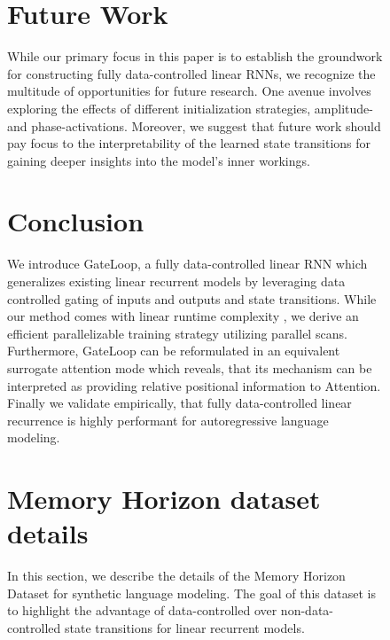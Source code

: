 \documentclass{article} \usepackage{iclr2024_conference,times}
\begin{document}
\begin{figure}[H]
\begin{minipage}{0.6\textwidth}
\section{Future Work}

While our primary focus in this paper is to establish the groundwork for constructing fully data-controlled linear RNNs, we recognize the multitude of opportunities for future research. One avenue involves exploring the effects of different initialization strategies, amplitude- and phase-activations. Moreover, we suggest that future work should pay focus to the interpretability of the learned state transitions for gaining deeper insights into the model's inner workings.

\section{Conclusion}

We introduce GateLoop, a fully data-controlled linear RNN which generalizes existing linear recurrent models by leveraging data controlled gating of inputs and outputs and state transitions. While our method comes with linear runtime complexity ,  we derive an efficient parallelizable  training strategy utilizing parallel scans. Furthermore, GateLoop can be reformulated in an equivalent  surrogate attention mode which reveals, that its mechanism can be interpreted as providing relative positional information to Attention. Finally we validate empirically, that fully data-controlled linear recurrence is highly performant for autoregressive language modeling.  




\appendix

\section{Memory Horizon dataset details}\label{sec:memory_horizon_details}

In this section, we describe the details of the Memory Horizon Dataset for synthetic language modeling. The goal of this dataset is to highlight the advantage of data-controlled over non-data-controlled state transitions for linear recurrent models.


\end{minipage}
\end{figure}
\end{document}
